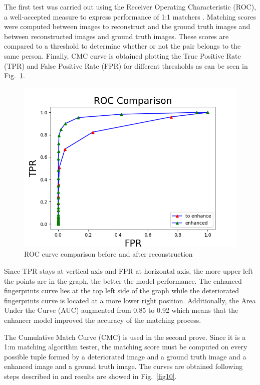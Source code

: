 \documentclass[a4paper,fleqn]{cas-dc}
\begin{document}
The first test was carried out using the Receiver Operating Characteristic (ROC), a well-accepted measure to express performance of 1:1 matchers \cite{RROCCMC}. Matching scores were computed between images to reconstruct and the ground truth images and between reconstructed images and ground truth images. These scores are compared to a threshold to determine whether or not the pair belongs to the same person. Finally, CMC curve is obtained plotting the True Positive Rate (TPR) and False Positive Rate (FPR) for different thresholds as can be seen in Fig.~\ref{fig9}.

\begin{figure}[htbp]
\centerline{\includegraphics[scale=0.45]{figs/roc_comparison.png}}
\caption{ROC curve comparison before and after reconstruction}
\label{fig9}
\end{figure}

Since TPR stays at vertical axis and FPR at horizontal axis, the more upper left the points are in the graph, the better the model performance. The enhanced fingerprints curve lies at the top left side of the graph while the deteriorated fingerprints curve is located at a more lower right position. Additionally, the Area Under the Curve (AUC) augmented from 0.85 to 0.92 which means that the enhancer model improved the accuracy of the matching process.

The Cumulative Match Curve (CMC) is used in the second prove. Since it is a 1:m matching algorithm tester, the matching score must be computed on every possible tuple formed by a deteriorated image and a ground truth image and a enhanced image and a ground truth image. The curves are obtained following steps described in \cite{RROCCMC} and results are showed in Fig.~\ref{fig10}.
\end{document}

